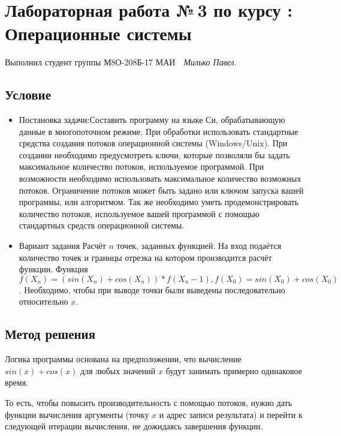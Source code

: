 \documentclass[12pt]{article}
\begin{document}
\section*{\centering Лабораторная работа №\,3 по курсу :\\ Операционные системы}

Выполнил студент группы М8О-208Б-17 МАИ \,\, \textit{Милько Павел}.

\subsection*{Условие}

\begin{itemize}
    \item Постановка задачи:\subitem Составить программу на языке Си, обрабатывающую данные в многопоточном режиме. При обработки использовать стандартные средства создания потоков операционной системы (Windows/Unix). При создании необходимо предусмотреть ключи, которые позволяли бы задать максимальное количество потоков, используемое программой. При возможности необходимо использовать максимальное количество возможных потоков. Ограничение потоков может быть задано или ключом запуска вашей программы, или алгоритмом.
    Так же необходимо уметь продемонстрировать количество потоков, используемое вашей программой с помощью стандартных средств операционной системы.
    
    \item Вариант задания  \subitem Расчёт $n$ точек, заданных функцией. На вход подаётся количество точек и границы отрезка на котором производится расчёт функции. Функция $f(X_n) = (sin(X_n)+cos(X_n))* f(X_n-1), f(X_0) = sin(X_0)+cos(X_0)$. Необходимо, чтобы при выводе точки были выведены последовательно относительно $x$.
\end{itemize}

\subsection*{Метод решения}

Логика программы основана на предположении, что вычисление $sin(x)+cos(x)$ для любых значений $x$ будут занимать примерно одинаковое время. 

То есть, чтобы повысить производительность с помощью потоков, нужно дать функции вычисления аргументы (точку $x$ и адрес записи результата) и перейти к следующей итерации вычисления, не дожидаясь завершения функции. 
\end{document}
